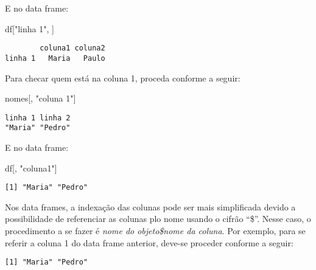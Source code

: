 \documentclass[
  letterpaper,
  DIV=11,
  numbers=noendperiod]{scrreprt}
\newenvironment{Shaded}{\begin{snugshade}}{\end{snugshade}}
\newcommand{\NormalTok}[1]{\textcolor[rgb]{0.00,0.23,0.31}{#1}}
\newcommand{\SpecialCharTok}[1]{\textcolor[rgb]{0.37,0.37,0.37}{#1}}
\newcommand{\StringTok}[1]{\textcolor[rgb]{0.13,0.47,0.30}{#1}}
\begin{document}
E no data frame:

\begin{Shaded}
\begin{Highlighting}[]
\NormalTok{df[}\StringTok{"linha 1"}\NormalTok{, ]}
\end{Highlighting}
\end{Shaded}

\begin{verbatim}
        coluna1 coluna2
linha 1   Maria   Paulo
\end{verbatim}

Para checar quem está na coluna 1, proceda conforme a seguir:

\begin{Shaded}
\begin{Highlighting}[]
\NormalTok{nomes[, }\StringTok{"coluna 1"}\NormalTok{]}
\end{Highlighting}
\end{Shaded}

\begin{verbatim}
linha 1 linha 2 
"Maria" "Pedro" 
\end{verbatim}

E no data frame:

\begin{Shaded}
\begin{Highlighting}[]
\NormalTok{df[, }\StringTok{"coluna1"}\NormalTok{]}
\end{Highlighting}
\end{Shaded}

\begin{verbatim}
[1] "Maria" "Pedro"
\end{verbatim}

Nos data frames, a indexação das colunas pode ser mais simplificada
devido a possibilidade de referenciar as colunas plo nome usando o
cifrão ``\$''. Nesse caso, o procedimento a se fazer é \emph{nome do
objeto\$nome da coluna}. Por exemplo, para se referir a coluna 1 do data
frame anterior, deve-se proceder conforme a seguir:

\begin{Shaded}
\end{Shaded}

\begin{verbatim}
[1] "Maria" "Pedro"
\end{verbatim}
\end{document}
